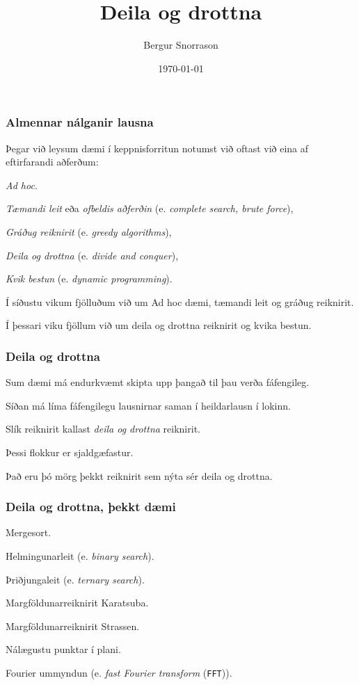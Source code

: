 \title{Deila og drottna}
\author{Bergur Snorrason}
\date{\today}



\frame{\titlepage}

{
	\frametitle{Almennar nálganir lausna}
	{
		\item<1-> Þegar við leysum dæmi í keppnisforritun notumst við oftast við eina af eftirfarandi aðferðum:
		{
			\item<2-> \emph{Ad hoc}.
			\item<3-> \emph{Tæmandi leit} eða \emph{ofbeldis aðferðin} (e. \emph{complete search, brute force}),
			\item<4-> \emph{Gráðug reiknirit} (e. \emph{greedy algorithms}),
			\item<5-> \emph{Deila og drottna} (e. \emph{divide and conquer}),
			\item<6-> \emph{Kvik bestun} (e. \emph{dynamic programming}).
		}
		\item<7-> Í síðustu vikum fjölluðum við um Ad hoc dæmi, tæmandi leit og gráðug reiknirit.
		\item<8-> Í þessari viku fjöllum við um deila og drottna reiknirit og kvika bestun.
	}
}

{
	\frametitle{Deila og drottna}
	{
		\item<1-> Sum dæmi má endurkvæmt skipta upp þangað til þau verða fáfengileg.
		\item<2-> Síðan má líma fáfengilegu lausnirnar saman í heildarlausn í lokinn.
		\item<3-> Slík reiknirit kallast \emph{deila og drottna} reiknirit.
		\item<4-> Þessi flokkur er sjaldgæfastur.
		\item<5-> Það eru þó mörg þekkt reiknirit sem nýta sér deila og drottna.
	}
}

{
	\frametitle{Deila og drottna, þekkt dæmi}
	{
		\item<1-> Mergesort.
		\item<2-> Helmingunarleit (e. \emph{binary search}).
		\item<3-> Þriðjungaleit (e. \emph{ternary search}).
		\item<4-> Margföldunarreiknirit Karatsuba.
		\item<5-> Margföldunarreiknirit Strassen.
		\item<6-> Nálægustu punktar í plani.
		\item<7-> Fourier ummyndun (e. \emph{fast Fourier transform} (\texttt{FFT})).
	}
}

